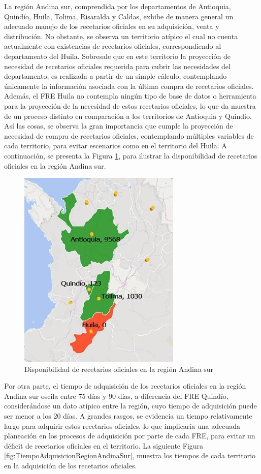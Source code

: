 \documentclass[
]{book}
\begin{document}
La región Andina sur, comprendida por los departamentos de Antioquia, Quindío, Huila, Tolima, Risaralda y Caldas, exhibe de manera general un adecuado manejo de los recetarios oficiales en su adquisición, venta y distribución. No obstante, se observa un territorio atípico el cual no cuenta actualmente con existencias de recetarios oficiales, correspondiendo al departamento del Huila. Sobresale que en este territorio la proyección de necesidad de recetarios oficiales requerida para cubrir las necesidades del departamento, es realizada a partir de un simple cálculo, contemplando únicamente la información asociada con la última compra de recetarios oficiales. Además, el FRE Huila no contempla ningún tipo de base de datos o herramienta para la proyección de la necesidad de estos recetarios oficiales, lo que da muestra de un proceso distinto en comparación a los territorios de Antioquia y Quindio. Así las cosas, se observa la gran importancia que cumple la proyección de necesidad de compra de recetarios oficiales, contemplando múltiples variables de cada territorio, para evitar escenarios como en el territorio del Huila. A continuación, se presenta la Figura \ref{fig:DisponibRecetarioRegionAndinaSur}, para ilustrar la disponibilidad de recetarios oficiales en la región Andina sur.

\begin{figure}
\includegraphics[width=0.5\linewidth]{figures/Imagen10} \caption{Disponibilidad de recetarios oficiales en la región Andina sur}\label{fig:DisponibRecetarioRegionAndinaSur}
\end{figure}

Por otra parte, el tiempo de adquisición de los recetarios oficiales en la región Andina sur oscila entre 75 días y 90 días, a diferencia del FRE Quindío, considerándose un dato atípico entre la región, cuyo tiempo de adquisición puede ser menor a los 20 días. A grandes rasgos, se evidencia un tiempo relativamente largo para adquirir estos recetarios oficiales, lo que implicaría una adecuada planeación en los procesos de adquisición por parte de cada FRE, para evitar un déficit de recetarios oficiales en el territorio. La siguiente Figura \ref{fig:TiempoAdquisicionRegionAndinaSur}, muestra los tiempos de cada territorio en la adquisición de los recetarios oficiales.
\end{document}
